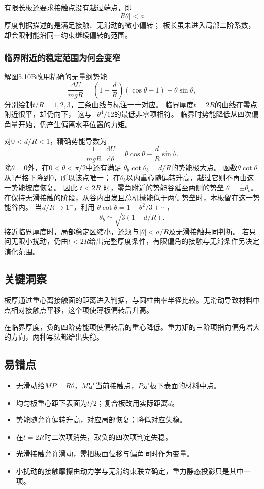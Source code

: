 \documentclass[UTF8,fontset=fandol,a4paper,11pt]{ctexart}
\newcommand{\dd}{\mathop{}\!\mathrm{d}}
\begin{document}
有限长板还要求接触点没有越过端点，即
\[
|R\theta|<a.
\]
厚度判据描述的是满足接触、无滑动的微小偏转；
板长虽未进入局部二阶系数，却会限制能沿同一约束继续偏转的范围。

\subsubsection*{临界附近的稳定范围为何会变窄}
解图5.10B改用精确的无量纲势能
\[
\frac{\Delta U}{mgR}
=\left(1+\frac dR\right)(\cos\theta-1)+\theta\sin\theta,
\]
分别绘制$t/R=1,2,3$，三条曲线与标注一一对应。
临界厚度$t=2R$的曲线在零点附近很平，却仍向下，
这与$-\theta^4/12$的最低非零项相符。
临界时势能降低从四次偏角量开始，仍产生偏离水平位置的力矩。

对$0<d/R<1$，精确势能导数为
\[
\frac1{mgR}\frac{\dd U}{\dd\theta}
=\theta\cos\theta-\frac dR\sin\theta.
\]
除$\theta=0$外，在$0<\theta<\pi/2$中还有满足
$\theta_b\cot\theta_b=d/R$的势能极大点。
函数$\theta\cot\theta$从1严格下降到0，所以该点唯一；
在$\theta_b$以内重心随偏转升高，越过它则不再由这一势能坡度恢复。
因此 $t<2R$ 时，零角附近的势能谷延至两侧的势垒 $\theta=\pm\theta_b$。在保持无滑接触的阶段，从谷内出发且总机械能低于两侧势垒时，木板留在这一势能谷内。
当$d/R\to1^-$，利用
$\theta\cot\theta=1-\theta^2/3+\cdots$，
\[
\theta_b\simeq\sqrt{3(1-d/R)}.
\]
接近临界厚度时，局部稳定区缩小，还须与$|\theta|<a/R$及无滑接触共同判断。
若只问无限小扰动，仍由$t<2R$给出完整厚度条件，有限偏角的接触与无滑条件另决定演化范围。




\subsection*{关键洞察}

板厚通过重心离接触面的距离进入判据，与圆柱曲率半径比较。无滑动导致材料中点相对接触点平移，这个项使薄板偏转后升高。

在临界厚度，负的四阶势能项使偏转后的重心降低。重力矩的三阶项指向偏角增大的方向，两种写法都给出失稳。



\subsection*{易错点}

\begin{itemize}
\item 无滑动给$MP=R\theta$，$M$是当前接触点，$P$是板下表面的材料中点。
\item 均匀板重心距下表面为$t/2$；复合板改用实际距离$d$。
\item 势能随允许偏转升高，对应局部恢复；降低对应失稳。
\item 在$t=2R$时二次项消失，取负的四次项判定失稳。
\item 光滑接触允许滑动，需把板面位移与偏角同时作为变量。
\item 小扰动的接触摩擦由动力学与无滑约束联立确定，重力静态投影只是其中一项。
\end{itemize}
\end{document}
